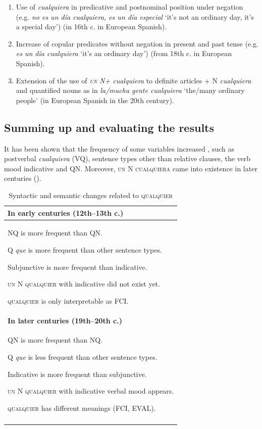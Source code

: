 \begin{enumerate}[label=\arabic*., leftmargin=2em]
    \item Use of \textit{cualquiera} in predicative and postnominal position under negation (e.g. \textit{no es un día cualquiera, es un día especial} ‘it’s not an ordinary day, it’s a special day’) (in 16th c. in European Spanish).
    
    \item Increase of copular predicates without negation in present and past tense (e.g. \textit{es un día cualquiera} ‘it’s an ordinary day’) (from 18th c. in European Spanish).
    
    \item Extension of the use of \textit{\textsc{un} N+ cualquiera} to definite articles + N \textit{cualquiera} and quantified nouns as in \textit{la/mucha gente cualquiera} ‘the/many ordinary people’ (in European Spanish in the 20th century).

\end{enumerate}

\subsection{Summing up and evaluating the results}\label{sec:5.2.3}

It has been shown that the frequency of some variables increased , such as postverbal \textit{cualquiera} (VQ), sentence types other than relative clauses, the verb mood indicative and QN. Moreover, \textsc{un} N \textsc{cualquiera} came into existence in later centuries ().


\begin{table}
\caption{Syntactic and semantic changes related to \textsc{qualquier}}
\begin{tabularx}{\textwidth}{X}
\lsptoprule
{\bfseries {In early centuries (12th–13th c.)} }\\
\midrule
  NQ is more frequent than QN.

  Q \textit{que} is more frequent than other sentence types.

  Subjunctive is more frequent than indicative.

  \textsc{un} N \textsc{qualquier} with indicative did not exist yet.

  \textsc{qualquier} is only interpretable as FCI.\\

\tablevspace
  {\bfseries {In later centuries (19th–20th c.)}}\\
\midrule
  QN is more frequent than NQ.

  Q \textit{que} is less frequent than other sentence types.

  Indicative is more frequent than subjunctive.

  \textsc{un} N \textsc{qualquier} with indicative verbal mood appears.

  \textsc{qualquier} has different meanings (FCI, EVAL).\\
\lspbottomrule
\end{tabularx}
\label{tab:key:syntactic}
\end{table}

